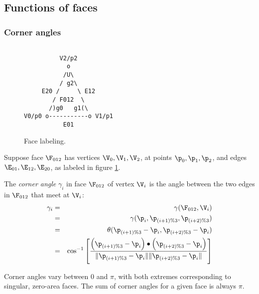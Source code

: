 
\subsection{Functions of faces}
\label{sec:faces}



\subsubsection{Corner angles}
\label{sec:corner_angles}

\begin{figure}[!htp]
\centering
\begin{verbatim}

          V2/p2
            o
           /U\
          / g2\
     E20 /     \ E12
        / F012  \
       /)g0   g1(\
V0/p0 o-----------o V1/p1
           E01

\end{verbatim}
\caption{Face labeling.
\label{fig:face_labeling}}
\end{figure}

Suppose face $\F_{012}$ has vertices $\V_0, \V_1, \V_2$,
at points $\p_0, \p_1, \p_2$,
and edges $\E_{01}, \E_{12}, \E_{20}$,
as labeled in figure \ref{fig:face_labeling}.

The {\em corner angle} $\gamma_i$ in face $\F_{012}$ of vertex $\V_i$ is
the angle between the two edges in $\F_{012}$ that meet at $\V_i$:
\begin{eqnarray}
\gamma_i
& = & \gamma(\F_{012},\V_i)
\\
& = & \gamma(\p_i,\p_{(i+1) \% 3},\p_{(i+2) \% 3})
\nonumber
\\
& = & \theta(\p_{(i+1) \% 3} - \p_i,\p_{(i+2) \% 3} - \p_i)
\nonumber
\\
& = &
\cos^{-1}
\left[
\frac{ \left( \p_{(i+1) \% 3} - \p_i \right)
  \bullet
  \left( \p_{(i+2) \% 3} - \p_i \right) }
{ \| \p_{(i+1) \% 3} - \p_i \|
  \| \p_{(i+2) \% 3} - \p_i \| }
\right]
\nonumber
\end{eqnarray}

Corner angles vary between $0$ and $\pi$, with both extremes
corresponding to singular, zero-area faces.
The sum of corner angles for a given face is always $\pi$.

